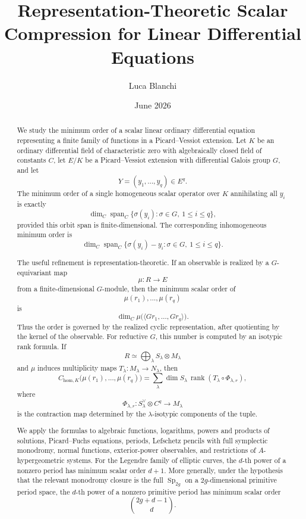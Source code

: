 \documentclass[11pt]{article}
\title{Representation-Theoretic Scalar Compression for Linear Differential Equations}
\author{Luca Blanchi}
\date{June 2026}
\DeclareMathOperator{\Span}{span}
\DeclareMathOperator{\rank}{rank}
\begin{document}
\maketitle

\begin{abstract}
We study the minimum order of a scalar linear ordinary differential equation representing a finite family of functions in a Picard--Vessiot extension. Let \(K\) be an ordinary differential field of characteristic zero with algebraically closed field of constants \(C\), let \(E/K\) be a Picard--Vessiot extension with differential Galois group \(G\), and let
\[
Y=(y_1,\ldots,y_q)\in E^q.
\]
The minimum order of a single homogeneous scalar operator over \(K\) annihilating all \(y_i\) is exactly
\[
\dim_C\Span_C\{\sigma(y_i):\sigma\in G,\ 1\le i\le q\},
\]
provided this orbit span is finite-dimensional. The corresponding inhomogeneous minimum order is
\[
\dim_C\Span_C\{\sigma(y_i)-y_i:\sigma\in G,\ 1\le i\le q\}.
\]

The useful refinement is representation-theoretic. If an observable is realized by a \(G\)-equivariant map
\[
\mu:R\to E
\]
from a finite-dimensional \(G\)-module, then the minimum scalar order of
\[
\mu(r_1),\ldots,\mu(r_q)
\]
is
\[
\dim_C\mu\bigl(\langle G r_1,\ldots,G r_q\rangle\bigr).
\]
Thus the order is governed by the realized cyclic representation, after quotienting by the kernel of the observable. For reductive \(G\), this number is computed by an isotypic rank formula. If
\[
R\simeq\bigoplus_\lambda S_\lambda\otimes M_\lambda
\]
and \(\mu\) induces multiplicity maps \(T_\lambda:M_\lambda\to N_\lambda\), then
\[
C_{\mathrm{hom},K}\bigl(\mu(r_1),\ldots,\mu(r_q)\bigr)
=
\sum_\lambda
\dim S_\lambda\,
\rank(T_\lambda\circ\Phi_{\lambda,r}),
\]
where
\[
\Phi_{\lambda,r}:S_\lambda^\vee\otimes C^q\to M_\lambda
\]
is the contraction map determined by the \(\lambda\)-isotypic components of the tuple.

We apply the formulas to algebraic functions, logarithms, powers and products of solutions, Picard--Fuchs equations, periods, Lefschetz pencils with full symplectic monodromy, normal functions, exterior-power observables, and restrictions of \(A\)-hypergeometric systems. For the Legendre family of elliptic curves, the \(d\)-th power of a nonzero period has minimum scalar order \(d+1\). More generally, under the hypothesis that the relevant monodromy closure is the full \(\operatorname{Sp}_{2g}\) on a \(2g\)-dimensional primitive period space, the \(d\)-th power of a nonzero primitive period has minimum scalar order
\[
\binom{2g+d-1}{d}.
\]
\end{abstract}
\end{document}
